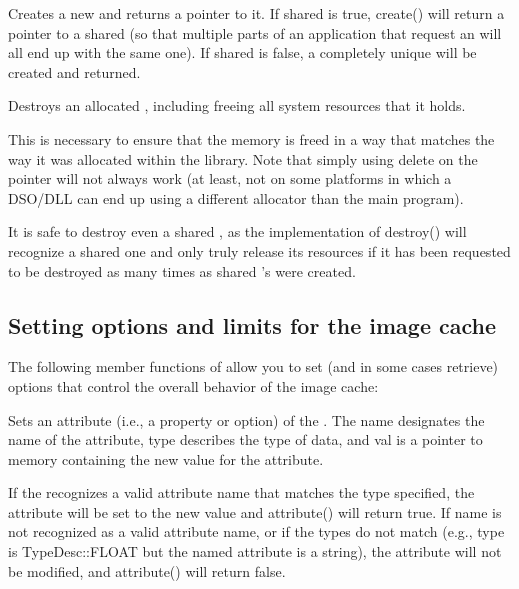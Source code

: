 
Creates a new \ImageCache and returns a pointer to it.  If 
{\cf shared} is {\cf true}, {\cf create()} will return a pointer
to a shared \ImageCache (so that multiple parts of an application
that request an \ImageCache will all end up with the same one).
If {\cf shared} is {\cf false}, a completely unique \ImageCache
will be created and returned.

\apiend

Destroys an allocated \ImageCache, including freeing all system
resources that it holds.

This is necessary to ensure that the memory is freed in a way that
matches the way it was allocated within the library.  Note that simply
using {\cf delete} on the pointer will not always work (at least,
not on some platforms in which a DSO/DLL can end up using a different
allocator than the main program).

It is safe to destroy even a shared \ImageCache, as the implementation
of {\cf destroy()} will recognize a shared one and only truly release
its resources if it has been requested to be destroyed as many times as
shared \ImageCache's were created.
\apiend

\subsection{Setting options and limits for the image cache}
\label{sec:imagecache:api:attribute}

The following member functions of \ImageCache allow you to set
(and in some cases retrieve) options that control the overall
behavior of the image cache:


Sets an attribute (i.e., a property or option) of the \ImageCache.
The {\cf name} designates the name of the attribute, {\cf type}
describes the type of data, and {\cf val} is a pointer to memory 
containing the new value for the attribute.

If the \ImageCache recognizes a valid attribute name that matches the
type specified, the attribute will be set to the new value and {\cf
  attribute()} will return {\cf true}.  If {\cf name} is not recognized
as a valid attribute name, or if the types do not match (e.g., {\cf
  type} is {\cf TypeDesc::FLOAT} but the named attribute is a string),
the attribute will not be modified, and {\cf attribute()} will return
{\cf false}.

